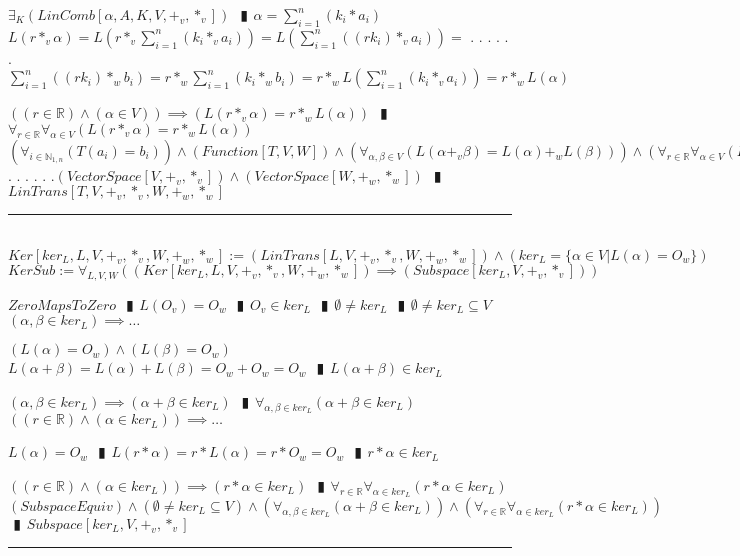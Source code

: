 \documentclass{book}
\newcommand{\abr}{:=}
\newcommand{\cont}{\phantom{.}. . .\phantom{.}}
\newcommand{\pipe}{$\phantom{(}\vrectangleblack\phantom{)}$}
\newcommand{\pr}[1]{\left(#1\right)}
\begin{document}
\begin{enumerate}
  \begin{enumerate}
    \lit $\exists_{K}(LinComb[\alpha, A, K, V, +_v, *_v])$ \pipe $\alpha = \sum_{i = 1}^{n}(k_i * a_i)$
    \lit $L(r *_v \alpha) = L\pr{r *_v \sum_{i = 1}^{n}(k_i *_v a_i)} = L\pr{\sum_{i = 1}^{n}\pr{(r k_i) *_v a_i}} = $ \cont
    \lit \cont $\sum_{i = 1}^{n}\pr{(r k_i) *_w b_i} = r *_w \sum_{i = 1}^{n}(k_i *_w b_i) = r *_w L\pr{\sum_{i = 1}^{n}(k_i *_v a_i)} = r *_w L(\alpha)$
  \end{enumerate}
  \lit $\pr{(r \in \mathbb{R}) \land (\alpha \in V)} \implies \pr{L(r *_v \alpha) = r *_w L(\alpha)}$ \pipe $\forall_{r \in \mathbb{R}} \forall_{\alpha \in V}\pr{L(r *_v \alpha) = r *_w L(\alpha)}$
  \lit $\pr{\forall_{i \in \mathbb{N}_{1, n}}\pr{T(a_i) = b_i}} \land (Function[T, V, W]) \land \pr{\forall_{\alpha, \beta \in V}\pr{L(\alpha +_v \beta) = L(\alpha) +_w L(\beta)}} \land \pr{\forall_{r \in \mathbb{R}} \forall_{\alpha \in V}\pr{L(r *_v \alpha) = r *_w L(\alpha)}} \land$ \cont
  \lit \cont $(VectorSpace[V, +_v, *_v]) \land (VectorSpace[W, +_w, *_w])$ \pipe $LinTrans[T, V, +_v, *_v, W, +_w, *_w]$
\end{enumerate} \vspace{.75mm} \hrule \vspace{.75mm} \ \\ 

$Ker[ker_L, L, V, +_v, *_v, W, +_w, *_w] \abr (LinTrans[L, V, +_v, *_v, W, +_w, *_w]) \land \pr{ker_L = \{\alpha \in V | L(\alpha) = O_w\}}$ \\

$KerSub \abr \forall_{L, V, W}\pr{(Ker[ker_L, L, V, +_v, *_v, W, +_w, *_w]) \implies (Subspace[ker_L, V, +_v, *_v])}$
\begin{enumerate}
  \lit $ZeroMapsToZero$ \pipe $L(O_v) = O_w$ \pipe $O_v \in ker_L$ \pipe $\emptyset \neq ker_L$ \pipe $\emptyset \neq ker_L \subseteq V$
  \lit $(\alpha, \beta \in ker_L) \implies \ldots$
  \begin{enumerate}
    \lit $\pr{L(\alpha) = O_w} \land \pr{L(\beta) = O_w}$ \lit $L(\alpha + \beta) = L(\alpha) + L(\beta) = O_w + O_w = O_w$ \pipe $L(\alpha + \beta) \in ker_L$
  \end{enumerate}
  \lit $(\alpha, \beta \in ker_L) \implies (\alpha + \beta \in ker_L)$ \pipe $\forall_{\alpha, \beta \in ker_L}(\alpha + \beta \in ker_L)$
  \lit $\pr{(r \in \mathbb{R}) \land (\alpha \in ker_L)} \implies \ldots$
  \begin{enumerate}
    \lit $L(\alpha) = O_w$ \pipe $L(r * \alpha) = r * L(\alpha) = r * O_w = O_w$ \pipe $r * \alpha \in ker_L$
  \end{enumerate}
  \lit $\pr{(r \in \mathbb{R}) \land (\alpha \in ker_L)} \implies (r * \alpha \in ker_L)$ \pipe $\forall_{r \in \mathbb{R}} \forall_{\alpha \in ker_L}(r * \alpha \in ker_L)$
  \lit $(SubspaceEquiv) \land (\emptyset \neq ker_L \subseteq V) \land \pr{\forall_{\alpha, \beta \in ker_L}(\alpha + \beta \in ker_L)} \land \pr{\forall_{r \in \mathbb{R}} \forall_{\alpha \in ker_L}(r * \alpha \in ker_L)}$ \pipe $Subspace[ker_L, V, +_v, *_v]$
\end{enumerate} \vspace{.75mm} \hrule \vspace{.75mm} \ \\ 
\end{document}
